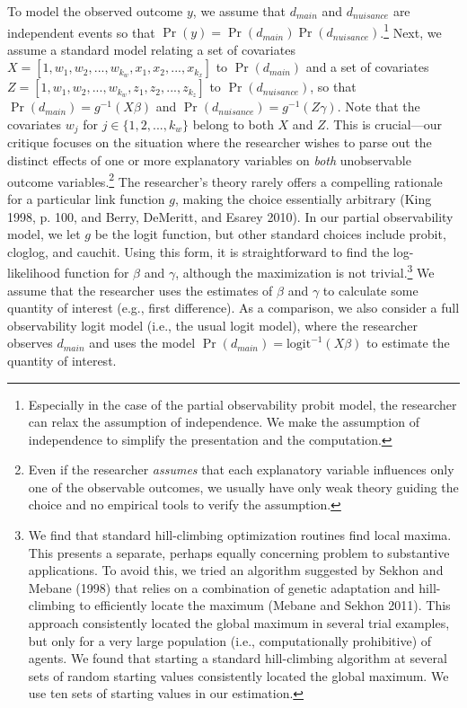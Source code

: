 \documentclass[10pt]{article}
\begin{document}
To model the observed outcome $y$, we assume that $d_{main}$ and $d_{nuisance}$ are independent events so that $\Pr(y) = \Pr(d_{main})\Pr(d_{nuisance})$.\footnote{Especially in the case of the partial observability probit model, the researcher can relax the assumption of independence. 
We make the assumption of independence to simplify the presentation and the computation.} 
Next, we assume a standard model relating a set of covariates $X = [1, w_1, w_2,..., w_{k_w}, x_1, x_2,..., x_{k_x}]$ to $\Pr(d_{main})$ and a set of covariates $Z = [1, w_1, w_2,..., w_{k_w}, z_1, z_2,..., z_{k_z}]$ to $\Pr(d_{nuisance})$, so that $\Pr(d_{main}) = g^{-1}(X\beta)$ and $\Pr(d_{nuisance}) = g^{-1}(Z\gamma)$.
Note that the covariates $w_j$ for $j \in \{1, 2,..., k_w\}$ belong to both $X$ and $Z$. 
This is crucial---our critique focuses on the situation where the researcher wishes to parse out the distinct effects of one or more explanatory variables on \textit{both} unobservable outcome variables.\footnote{Even if the researcher \textit{assumes} that each explanatory variable influences only one of the observable outcomes, we usually have only weak theory guiding the choice and no empirical tools to verify the assumption.} 
The researcher's theory rarely offers a compelling rationale for a particular link function $g$, making the choice essentially arbitrary (King 1998, p. 100, and Berry, DeMeritt, and Esarey 2010).
In our partial observability model, we let $g$ be the logit function, but other standard choices include probit, cloglog, and cauchit.
Using this form, it is straightforward to find the log-likelihood function for $\beta$ and $\gamma$, although the maximization is not trivial.\footnote{We find that standard hill-climbing optimization routines find local maxima. 
This presents a separate, perhaps equally concerning problem to substantive applications. 
To avoid this, we tried an algorithm suggested by Sekhon and Mebane (1998) that relies on a combination of genetic adaptation and hill-climbing to efficiently locate the maximum (Mebane and Sekhon 2011). 
This approach consistently located the global maximum in several trial examples, but only for a very large population (i.e., computationally prohibitive) of agents. 
We found that starting a standard hill-climbing algorithm at several sets of random starting values consistently located the global maximum. 
We use ten sets of starting values in our estimation.} 
We assume that the researcher uses the estimates of $\beta$ and $\gamma$ to calculate some quantity of interest (e.g., first difference). 
As a comparison, we also consider a full observability logit model (i.e., the usual logit model), where the researcher observes $d_{main}$ and uses the model $\Pr(d_{main}) = \text{logit}^{-1}(X\beta)$ to estimate the quantity of interest.
\end{document}
